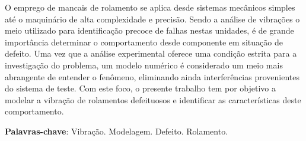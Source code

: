 \imprimircapa
\imprimirfolhaderosto
\clearpage


\begin{agradecimentos}
%	
%	
\end{agradecimentos}

\begin{resumo}
	\SingleSpacing
	O emprego de mancais de rolamento se aplica desde sistemas mecânicos simples até o maquinário de alta complexidade e precisão.
	Sendo a análise de vibrações o meio utilizado para identificação precoce de falhas nestas unidades, é de grande importância determinar o comportamento desde componente em situação de defeito.
	Uma vez que a análise experimental oferece uma condição estrita para a investigação do problema, um modelo numérico é considerado um meio mais abrangente de entender o fenômeno, eliminando ainda interferências provenientes do sistema de teste.
	Com este foco, o presente trabalho tem por objetivo a modelar a vibração de rolamentos defeituosos e identificar as características deste comportamento.
	\vspace{\onelineskip}
	
	\noindent
	\textbf{Palavras-chave}: Vibração. Modelagem. Defeito. Rolamento.
\end{resumo}


